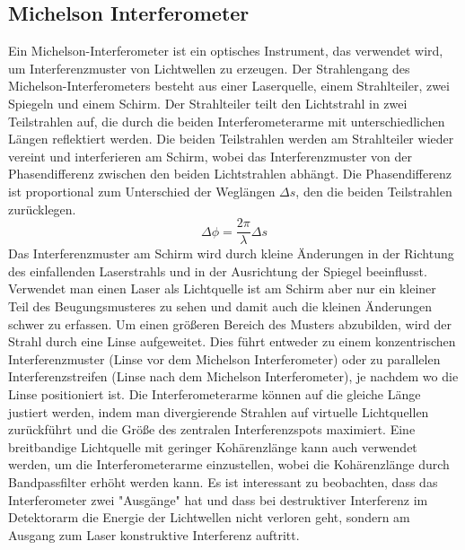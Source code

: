 \subsection{Michelson Interferometer}
Ein Michelson-Interferometer ist ein optisches Instrument, das verwendet wird, um Interferenzmuster von Lichtwellen zu erzeugen. 
Der Strahlengang des Michelson-Interferometers besteht aus einer Laserquelle, einem Strahlteiler, zwei Spiegeln und einem Schirm. 
Der Strahlteiler teilt den Lichtstrahl in zwei Teilstrahlen auf, die durch die beiden Interferometerarme mit unterschiedlichen Längen reflektiert werden. 
Die beiden Teilstrahlen werden am Strahlteiler wieder vereint und interferieren am Schirm, wobei das Interferenzmuster von der Phasendifferenz zwischen den beiden Lichtstrahlen abhängt. 
Die Phasendifferenz ist proportional zum Unterschied der Weglängen $\Delta s$, den die beiden Teilstrahlen zurücklegen.
\begin{equation}
    \Delta \phi = \frac{2 \pi}{\lambda} \Delta s
\end{equation}
Das Interferenzmuster am Schirm wird durch kleine Änderungen in der Richtung des einfallenden Laserstrahls und in der Ausrichtung der Spiegel beeinflusst.
Verwendet man einen Laser als Lichtquelle ist am Schirm aber nur ein kleiner Teil des Beugungsmusteres zu sehen und damit auch die kleinen Änderungen schwer zu erfassen.
Um einen größeren Bereich des Musters abzubilden, wird der Strahl durch eine Linse aufgeweitet.
Dies führt entweder zu einem konzentrischen Interferenzmuster (Linse vor dem Michelson Interferometer) oder zu parallelen Interferenzstreifen (Linse nach dem Michelson Interferometer), je nachdem wo die Linse positioniert ist. 
Die Interferometerarme können auf die gleiche Länge justiert werden, indem man divergierende Strahlen auf virtuelle Lichtquellen zurückführt und die Größe des zentralen Interferenzspots maximiert. 
Eine breitbandige Lichtquelle mit geringer Kohärenzlänge kann auch verwendet werden, um die Interferometerarme einzustellen, wobei die Kohärenzlänge durch Bandpassfilter erhöht werden kann.
Es ist interessant zu beobachten, dass das Interferometer zwei "Ausgänge" hat und dass bei destruktiver Interferenz im Detektorarm die Energie der Lichtwellen nicht verloren geht, sondern am Ausgang zum Laser konstruktive Interferenz auftritt.

